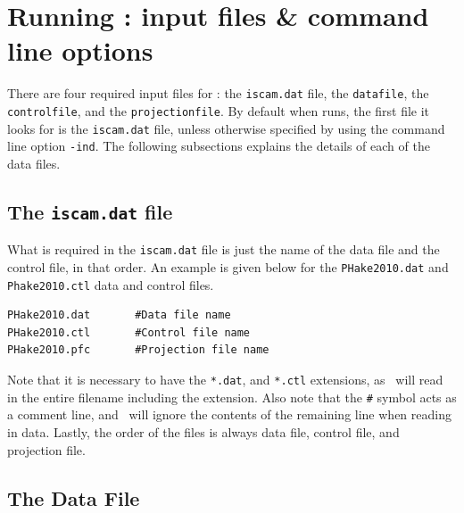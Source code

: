 

\section{Running \iscam: input files \& command line options} %
\label{sec:running_iscam_input_files_&_command_line_options}

\begin{multicols}{2}


There are four required input files for \iscam: the \verb"iscam.dat" file, the \verb"datafile",  the \verb"controlfile", and the \verb"projectionfile".  By default when \iscam runs, the first file it looks for is the \verb"iscam.dat" file, unless otherwise specified by using the command line option \verb"-ind".  The following subsections explains the details of each of the data files.


\subsection{The \texttt{iscam.dat} file}
What is required in the \verb"iscam.dat" file is just the name of the data file and the control file, in that order.  An example is given below for the \texttt{PHake2010.dat} and \texttt{Phake2010.ctl} data and control files.
\begin{verbatim}
PHake2010.dat       #Data file name
PHake2010.ctl       #Control file name
PHake2010.pfc       #Projection file name
\end{verbatim}
Note that it is necessary to have the \verb"*.dat", and \verb"*.ctl" extensions, as \iscam\ will read in the entire filename including the extension.  Also note that the \verb"#" symbol acts as a comment line, and \iscam\ will ignore the contents of the remaining line when reading in data. Lastly, the order of the files is always data file, control file, and projection file.

\subsection{The Data File} %
\label{sub:the_data_file}





\end{multicols}

